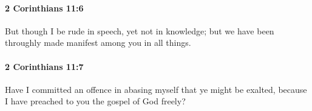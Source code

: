		\paragraph{2 Corinthians 11:6} %
			\label{2CORINTHIANS-11-6}

			But though I be rude in speech, yet not in knowledge; but we have been throughly made manifest among you in all things.

			\begin{framed}
			\scriptsize
				\begin{compactdesc}
					\item[SBLG] 
				\end{compactdesc}
			\end{framed}

		\paragraph{2 Corinthians 11:7} %
			\label{2CORINTHIANS-11-7}

			Have I committed an offence in abasing myself that ye might be exalted, because I have preached to you the gospel of God freely?

